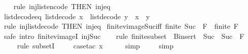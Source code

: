 \begin{isabellebody}
%
\isadelimproof
\ \ %
\endisadelimproof
%
\isatagproof
{}\isamarkupfalse%
\ {\isacharparenleft}rule\ inj{\isacharunderscore}list{\isacharunderscore}encode\ {\isacharbrackleft}THEN\ inj{\isacharunderscore}eq{\isacharbrackright}{\isacharparenright}%
\endisatagproof
{\isafoldproof}%
%
\isadelimproof
\isanewline
%
\endisadelimproof
\isanewline
{}\isamarkupfalse%
\ list{\isacharunderscore}decode{\isacharunderscore}eq{\isacharcolon}\ {\isachardoublequoteopen}list{\isacharunderscore}decode\ x\ {\isacharequal}\ list{\isacharunderscore}decode\ y\ {\isasymlongleftrightarrow}\ x\ {\isacharequal}\ y{\isachardoublequoteclose}\isanewline
%
\isadelimproof
\ \ %
\endisadelimproof
%
\isatagproof
{}\isamarkupfalse%
\ {\isacharparenleft}rule\ inj{\isacharunderscore}list{\isacharunderscore}decode\ {\isacharbrackleft}THEN\ inj{\isacharunderscore}eq{\isacharbrackright}{\isacharparenright}%
\endisatagproof
{\isafoldproof}%
%
\isadelimproof
%
\endisadelimproof
%
\isadelimdocument
%
\endisadelimdocument
%
\isatagdocument
%
\isamarkuptrue%
%
\isamarkuptrue%
%
\endisatagdocument
{\isafolddocument}%
%
\isadelimdocument
%
\endisadelimdocument
{}\isamarkupfalse%
\ finite{\isacharunderscore}vimage{\isacharunderscore}Suc{\isacharunderscore}iff{\isacharcolon}\ {\isachardoublequoteopen}finite\ {\isacharparenleft}Suc\ {\isacharminus}{\isacharbackquote}\ F{\isacharparenright}\ {\isasymlongleftrightarrow}\ finite\ F{\isachardoublequoteclose}\isanewline
%
\isadelimproof
\ \ %
\endisadelimproof
%
\isatagproof
{}\isamarkupfalse%
\ {\isacharparenleft}safe\ intro{\isacharbang}{\isacharcolon}\ finite{\isacharunderscore}vimageI\ inj{\isacharunderscore}Suc{\isacharparenright}\isanewline
\ \ \isamarkupfalse%
\ {\isacharparenleft}rule\ finite{\isacharunderscore}subset\ {\isacharbrackleft}\ B{\isacharequal}{\isachardoublequoteopen}insert\ {}\ {\isacharparenleft}Suc\ {\isacharbackquote}\ Suc\ {\isacharminus}{\isacharbackquote}\ F{\isacharparenright}{\isachardoublequoteclose}{\isacharbrackright}{\isacharparenright}\isanewline
\ \ \ \isamarkupfalse%
\ {\isacharparenleft}rule\ subsetI{\isacharparenright}\isanewline
\ \ \ \isamarkupfalse%
\ {\isacharparenleft}case{\isacharunderscore}tac\ x{\isacharparenright}\isanewline
\ \ \ \ \isamarkupfalse%
\ simp\isanewline
\ \ \ \isamarkupfalse%
\ simp\isanewline
\ \ \isamarkupfalse%

\end{isabellebody}
